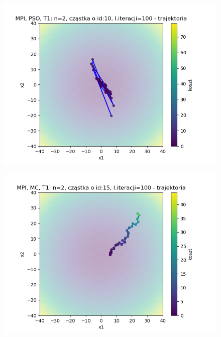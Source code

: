 \documentclass[11pt, a4paper, oneside]{article}
\begin{document}

\begin{figure}[H]
\centering
\begin{minipage}[b]{\dimexpr.5\textwidth-1em}
  \centering
  \includegraphics[width=1\linewidth]{grafiki2/MPI_PSO_T1/MPI_PSO_T1_trajectory_id10.png}
  \label{fig:trajektoriaWybrana:PSO1}
\end{minipage} \hfill
\begin{minipage}[b]{\dimexpr.5\textwidth-1em}
  \centering
  \includegraphics[width=1\linewidth]{grafiki2/MPI_MC_T1/MPI_ MC_T1_trajectory_id15.png}
  \label{fig:trajektoriaWybrana:MC1}
\end{minipage}
\end{figure}
\end{document}
